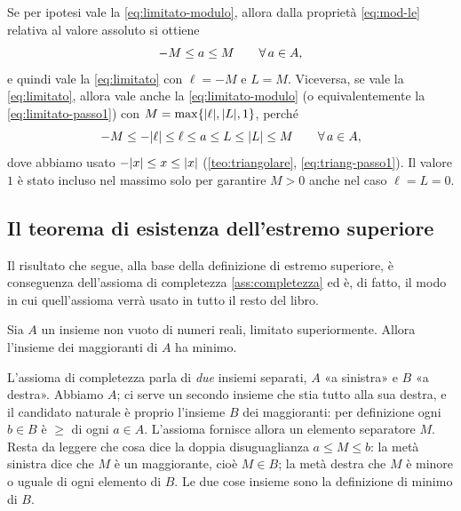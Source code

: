 \begin{dimostrazione}
Se per ipotesi vale la \eqref{eq:limitato-modulo}, allora dalla proprietà
\eqref{eq:mod-le} relativa al valore assoluto si ottiene
\begin{equation}\label{eq:limitato-passo1}
  -M\le a\le M \qquad \forall\, a\in A,
\end{equation}
e quindi vale la \eqref{eq:limitato} con $\ell=-M$ e $L=M$. Viceversa, se vale la
\eqref{eq:limitato}, allora vale anche la \eqref{eq:limitato-modulo} (o
equivalentemente la \eqref{eq:limitato-passo1}) con $M=\max\{\lvert \ell\rvert,\lvert L\rvert,1\}$,
perché
\begin{equation}\label{eq:limitato-passo2}
  -M\le-\lvert \ell\rvert\le\ell\le a\le L\le\lvert L\rvert\le M \qquad \forall\, a\in A,
\end{equation}
dove abbiamo usato $-\lvert x\rvert\le x\le\lvert x\rvert$ (\cref{teo:triangolare},
\eqref{eq:triang-passo1}). Il valore $1$ è stato incluso nel massimo solo per garantire
$M>0$ anche nel caso $\ell=L=0$.
\end{dimostrazione}

\subsection{Il teorema di esistenza dell'estremo superiore}

Il risultato che segue, alla base della definizione di estremo superiore, è
conseguenza dell'assioma di completezza \ref{ass:completezza} ed è, di fatto, il modo in
cui quell'assioma verrà usato in tutto il resto del libro.

\begin{teorema}\label{teo:esistenza-sup}
Sia $A$ un insieme non vuoto di numeri reali, limitato superiormente. Allora l'insieme
dei maggioranti di $A$ ha minimo.
\end{teorema}

\begin{schema}
\end{schema}

\begin{strategia}
L'assioma di completezza parla di \emph{due} insiemi separati, $A$ «a sinistra» e $B$ «a
destra». Abbiamo $A$; ci serve un secondo insieme che stia tutto alla sua destra, e il
candidato naturale è proprio l'insieme $B$ dei maggioranti: per definizione ogni $b\in B$
è $\ge$ di ogni $a\in A$. L'assioma fornisce allora un elemento separatore $M$. Resta da
leggere che cosa dice la doppia disuguaglianza $a\le M\le b$: la metà sinistra dice che
$M$ è un maggiorante, cioè $M\in B$; la metà destra che $M$ è minore o uguale di ogni
elemento di $B$. Le due cose insieme sono la definizione di minimo di $B$.
\end{strategia}

